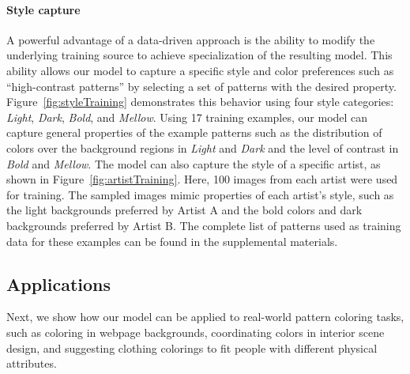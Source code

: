 \paragraph{Style capture} A powerful advantage of a data-driven approach is the ability to modify the underlying training source to achieve specialization of the resulting model. This ability allows our model to capture a specific style and color preferences such as ``high-contrast patterns'' by selecting a set of patterns with the desired property. Figure~\ref{fig:styleTraining} demonstrates this behavior using four style categories: \emph{Light}, \emph{Dark}, \emph{Bold}, and \emph{Mellow}. Using 17 training examples, our model can capture general properties of the example patterns such as the distribution of colors over the background regions in \emph{Light} and \emph{Dark} and the level of contrast in \emph{Bold} and \emph{Mellow}. The model can also capture the style of a specific artist, as shown in Figure~\ref{fig:artistTraining}. Here, 100 images from each artist were used for training. The sampled images mimic properties of each artist's style, such as the light backgrounds preferred by Artist A and the bold colors and dark backgrounds preferred by Artist B. The complete list of patterns used as training data for these examples can be found in the supplemental materials.

\subsection{Applications}

Next, we show how our model can be applied to real-world pattern coloring tasks, such as coloring in webpage backgrounds, coordinating colors in interior scene design, and suggesting clothing colorings to fit people with different physical attributes. %


